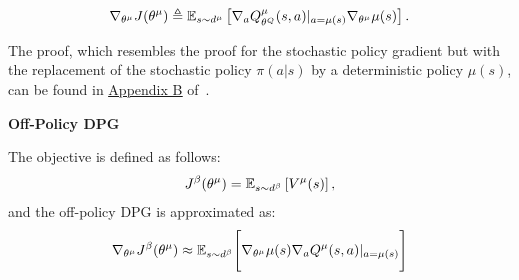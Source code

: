 \documentclass{article}
\begin{document}
\begin{align*}
\nabla_{\theta^\mu} J(\theta^\mu) \triangleq {\mathbb E}_{s \sim d^\mu}\left[\nabla_{a} Q^\mu_{\theta^Q}(s,a)\vert_{a = \mu(s)} \nabla_{\theta^\mu}\mu(s) \right].
\end{align*}

The proof, which resembles the proof for the stochastic policy gradient but with the replacement of the stochastic policy $\pi(a\vert s)$ by a deterministic policy $\mu(s)$, can be found 
in \href{http://proceedings.mlr.press/v32/silver14-supp.pdf}{\underline{Appendix B}} of~\cite{silver2014deterministic}.

\vspace{10pt}
\noindent\textbf{Off-Policy DPG}

\noindent The objective is defined as follows:
\begin{align}\label{eq:off_policy_dpg_objective}
J^\beta(\theta^\mu) = {\mathbb E}_{s \sim d^\beta} \left[V^\mu(s)\right],
\end{align}
and the off-policy DPG is approximated as:
\begin{align}\label{eq:off_policy_dpg}
    \nabla_{\theta^\mu} J^\beta(\theta^\mu) \approx {\mathbb E}_{s \sim d^\beta} \Bigg[\nabla_{\theta^\mu} \mu(s) \nabla_a Q^\mu(s,a)\vert_{a=\mu(s)}\Bigg]
\end{align}
\end{document}

